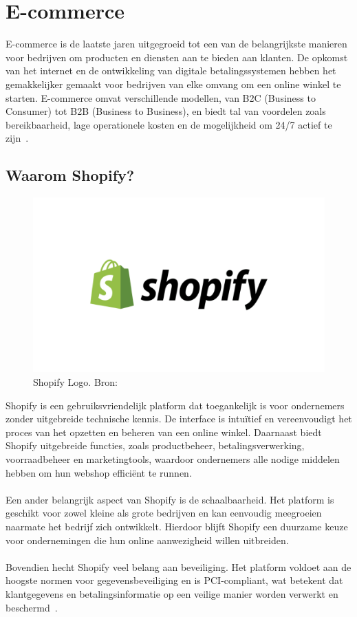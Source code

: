 \newpage

\section{E-commerce}%
\label{sec:E-commerce}

E-commerce is de laatste jaren uitgegroeid tot een van de belangrijkste manieren voor bedrijven om producten en diensten aan te bieden aan klanten. De opkomst van het internet en de ontwikkeling van digitale betalingssystemen hebben het gemakkelijker gemaakt voor bedrijven van elke omvang om een online winkel te starten. E-commerce omvat verschillende modellen, van B2C (Business to Consumer) tot B2B (Business to Business), en biedt tal van voordelen zoals bereikbaarheid, lage operationele kosten en de mogelijkheid om 24/7 actief te zijn~\autocite{bang2024}.

\subsection{Waarom Shopify?}

\begin{figure}
    \centering
    \includegraphics[width=0.8\linewidth]{Foto's/shopify-store}
    \caption{Shopify Logo. Bron:~\autocite{shopifyImage}}
    \label{fig:shopify-store}
\end{figure}


Shopify is een gebruiksvriendelijk platform dat toegankelijk is voor ondernemers zonder uitgebreide technische kennis. De interface is intuïtief en vereenvoudigt het proces van het opzetten en beheren van een online winkel. Daarnaast biedt Shopify uitgebreide functies, zoals productbeheer, betalingsverwerking, voorraadbeheer en marketingtools, waardoor ondernemers alle nodige middelen hebben om hun webshop efficiënt te runnen.
\\\\
Een ander belangrijk aspect van Shopify is de schaalbaarheid. Het platform is geschikt voor zowel kleine als grote bedrijven en kan eenvoudig meegroeien naarmate het bedrijf zich ontwikkelt. Hierdoor blijft Shopify een duurzame keuze voor ondernemingen die hun online aanwezigheid willen uitbreiden.
\\\\
Bovendien hecht Shopify veel belang aan beveiliging. Het platform voldoet aan de hoogste normen voor gegevensbeveiliging en is PCI-compliant, wat betekent dat klantgegevens en betalingsinformatie op een veilige manier worden verwerkt en beschermd~\autocite{bang2024}.

